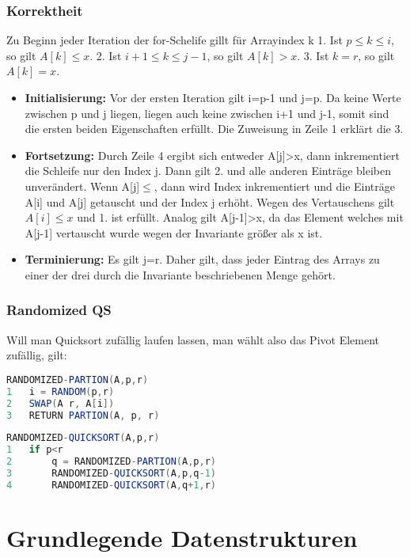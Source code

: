 \documentclass[jou,apacite]{apa6}
\begin{document}
\subsubsection{Korrektheit}
Zu Beginn jeder Iteration der for-Schelife gillt für Arrayindex k 1. Ist $p\le k \le i$, so gilt $A[k]\le x$. 2. Ist $i+1\le k \le j-1$, so gilt $A[k]>x$. 3. Ist $k=r$, so gilt $A[k]=x$.\\
\begin{itemize}
\item {\bfseries Initialisierung:} Vor der ersten Iteration gilt i=p-1 und j=p. Da keine Werte zwischen p und j liegen, liegen auch keine zwischen i+1 und j-1, somit sind die ersten beiden Eigenschaften erfüllt. Die Zuweisung in Zeile 1 erklärt die 3. 
\item {\bfseries Fortsetzung:}
Durch Zeile 4 ergibt sich entweder A[j]>x, dann inkrementiert die Schleife nur den Index j. Dann gilt 2. und alle anderen Einträge bleiben unverändert. Wenn A[j]$\le$, dann wird Index inkrementiert und die Einträge A[i] und A[j] getauscht und der Index j erhöht. Wegen des Vertauschens gilt $A[i]\le x$ und 1. ist erfüllt. Analog gilt A[j-1]>x, da das Element welches mit A[j-1] vertauscht wurde wegen der Invariante größer als x ist. 
\item {\bfseries Terminierung:} Es gilt j=r. Daher gilt, dass jeder Eintrag des Arrays zu einer der drei durch die Invariante beschriebenen Menge gehört.
\end{itemize}

\subsubsection{Randomized QS}
Will man Quicksort zufällig laufen lassen, man wählt also das Pivot Element zufällig, gilt:

\begin{lstlisting}[language=java]
RANDOMIZED-PARTION(A,p,r)
1   i = RANDOM(p,r)
2   SWAP(A r, A[i])
3   RETURN PARTION(A, p, r)
\end{lstlisting}

\begin{lstlisting}[language=java]
RANDOMIZED-QUICKSORT(A,p,r)
1   if p<r
2       q = RANDOMIZED-PARTION(A,p,r)
3       RANDOMIZED-QUICKSORT(A,p,q-1)
4       RANDOMIZED-QUICKSORT(A,q+1,r)
\end{lstlisting}



\section{Grundlegende Datenstrukturen}
\end{document}
